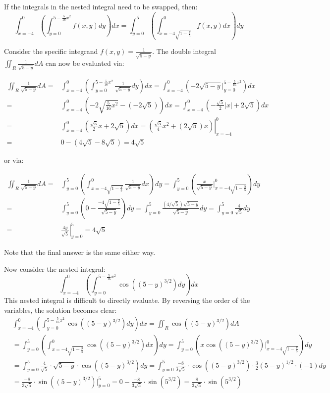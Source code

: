 \documentclass{article}
\begin{document}
If the integrals in the nested integral need to be swapped, then:
\[\int_{x = -4}^0 \left(\int_{y = 0}^{5 - \frac{5}{16}x^2} f(x,y)dy\right)dx = \int_{y = 0}^5 \left(\int_{x = -4\sqrt{1 - \frac{y}{5}}}^{0} f(x,y)dx\right)dy\]

Consider the specific integrand \(f(x, y) = \frac{1}{\sqrt{5-y}}\). The double integral \(\iint_R \frac{1}{\sqrt{5-y}} dA\) can now be evaluated via:

\begin{align*}
\iint_R \frac{1}{\sqrt{5-y}} dA = & \int_{x = -4}^0 \left(\int_{y = 0}^{5 - \frac{5}{16}x^2} \frac{1}{\sqrt{5-y}}dy\right)dx 
= \int_{x = -4}^0 \left(-2\sqrt{5-y}\Big|_{y = 0}^{5 - \frac{5}{16}x^2} \right)dx \\
= & \int_{x = -4}^0 \left(-2\sqrt{\frac{5}{16}x^2} - (-2\sqrt{5}) \right)dx 
= \int_{x = -4}^0 \left(-\frac{\sqrt{5}}{2}|x| + 2\sqrt{5} \right)dx \\  
= & \int_{x = -4}^0 \left(\frac{\sqrt{5}}{2}x + 2\sqrt{5} \right)dx 
= \left.\left(\frac{\sqrt{5}}{4}x^2 + (2\sqrt{5})x \right)\right|_{x = -4}^0 \\
= & 0 - \left(4\sqrt{5} - 8\sqrt{5}\right) 
= 4\sqrt{5}
\end{align*}

or via:

\begin{align*} 
\iint_R \frac{1}{\sqrt{5-y}} dA = & \int_{y = 0}^5 \left(\int_{x = -4\sqrt{1 - \frac{y}{5}}}^{0} \frac{1}{\sqrt{5-y}}dx\right)dy 
= \int_{y = 0}^5 \left(\frac{x}{\sqrt{5-y}}\bigg|_{x = -4\sqrt{1 - \frac{y}{5}}}^{0}\right)dy \\ 
= & \int_{y = 0}^5 \left(0 - \frac{-4\sqrt{1 - \frac{y}{5}}}{\sqrt{5-y}}\right)dy 
= \int_{y = 0}^5 \frac{(4/\sqrt{5})\sqrt{5 - y}}{\sqrt{5-y}}dy 
= \int_{y = 0}^5 \frac{4}{\sqrt{5}}dy \\
= & \left.\frac{4y}{\sqrt{5}}\right|_{y = 0}^5   
= 4\sqrt{5}
\end{align*} 

Note that the final answer is the same either way.

Now consider the nested integral: 
\[\int_{x = -4}^0 \left(\int_{y = 0}^{5 - \frac{5}{16}x^2} \cos((5 - y)^{3/2})dy\right)dx\]
This nested integral is difficult to directly evaluate. By reversing the order of the variables, the solution becomes clear:
\begin{align*} 
& \int_{x = -4}^0 \left(\int_{y = 0}^{5 - \frac{5}{16}x^2} \cos((5 - y)^{3/2})dy\right)dx 
= \iint_R \cos((5 - y)^{3/2})dA \\
& = \int_{y = 0}^5 \left(\int_{x = -4\sqrt{1 - \frac{y}{5}}}^{0} \cos((5 - y)^{3/2})dx\right)dy 
= \int_{y = 0}^5 \left(x\cos((5 - y)^{3/2})\Big|_{x = -4\sqrt{1 - \frac{y}{5}}}^{0}\right)dy \\ 
& = \int_{y = 0}^5 \frac{4}{\sqrt{5}} \cdot \sqrt{5 - y} \cdot \cos((5 - y)^{3/2}) dy  
= \int_{y = 0}^5 \frac{-8}{3\sqrt{5}} \cdot \cos((5 - y)^{3/2}) \cdot \frac{3}{2}(5 - y)^{1/2} \cdot (-1) dy \\
& = \frac{-8}{3\sqrt{5}} \cdot \sin((5 - y)^{3/2})\bigg|_{y = 0}^5 
= 0 - \frac{-8}{3\sqrt{5}} \cdot \sin(5^{3/2})  
= \frac{8}{3\sqrt{5}} \cdot \sin(5^{3/2})
\end{align*}
\end{document}
